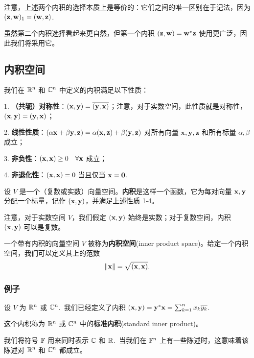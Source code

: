 注意，上述两个内积的选择本质上是等价的：它们之间的唯一区别在于记法，因为 $(\mathbf{z}, \mathbf{w})_1 = (\mathbf{w}, \mathbf{z})$.~

虽然第二个内积选择看起来更自然，但第一个内积 $(\mathbf{z}, \mathbf{w}) = \mathbf{w}^* \mathbf{z}$ 使用更广泛，因此我们将采用它。

\subsection{内积空间}\label{sec:05-01-03}

我们在 $\mathbb{R}^n$ 和 $\mathbb{C}^n$ 中定义的内积满足以下性质：

1. \textbf{（共轭）对称性}：$(\mathbf{x}, \mathbf{y}) = \overline{(\mathbf{y}, \mathbf{x})}$；注意，对于实数空间，此性质就是对称性，$(\mathbf{x}, \mathbf{y}) = (\mathbf{y}, \mathbf{x})$；

2. \textbf{线性性质}：$(\alpha \mathbf{x} + \beta \mathbf{y}, \mathbf{z}) = \alpha (\mathbf{x}, \mathbf{z}) + \beta (\mathbf{y}, \mathbf{z})$ 对所有向量 $\mathbf{x}, \mathbf{y}, \mathbf{z}$ 和所有标量 $\alpha, \beta$ 成立；

3. \textbf{非负性}：$(\mathbf{x}, \mathbf{x}) \ge 0 \quad \forall \mathbf{x}$ 成立；

4. \textbf{非退化性}：$(\mathbf{x}, \mathbf{x}) = 0$ 当且仅当 $\mathbf{x} = \mathbf{0}$.~

设 $V$ 是一个（复数或实数）向量空间。\textbf{内积}是这样一个函数，它为每对向量 $\mathbf{x}, \mathbf{y}$ 分配一个标量，记作 $(\mathbf{x}, \mathbf{y})$，并满足上述性质 1-4。

注意，对于实数空间 $V$，我们假定 $(\mathbf{x}, \mathbf{y})$ 始终是实数；对于复数空间，内积 $(\mathbf{x}, \mathbf{y})$ 可以是复数。

一个带有内积的向量空间 $V$ 被称为\textbf{内积空间}(inner product space)。给定一个内积空间，我们可以定义其上的范数
$$\| \mathbf{x} \| = \sqrt{(\mathbf{x}, \mathbf{x})}.$$

\subsubsection{例子}\label{sec:05-01-03-01}

\begin{example}\label{stmt:05-01-01}
设 $V$ 为 $\mathbb{R}^n$ 或 $\mathbb{C}^n$.~我们已经定义了内积 $(\mathbf{x}, \mathbf{y}) = \mathbf{y}^* \mathbf{x} = \sum_{k=1}^n  x_k\overline{y_k}$.~
\end{example}

这个内积称为 $\mathbb{R}^n$ 或 $\mathbb{C}^n$ 中的\textbf{标准内积}(standard inner product)。

我们将符号 $\mathbb{F}$ 用来同时表示 $\mathbb{C}$ 和 $\mathbb{R}$.~当我们在 $\mathbb{F}^n$ 上有一些陈述时，这意味着该陈述对 $\mathbb{R}^n$ 和 $\mathbb{C}^n$ 都成立。

